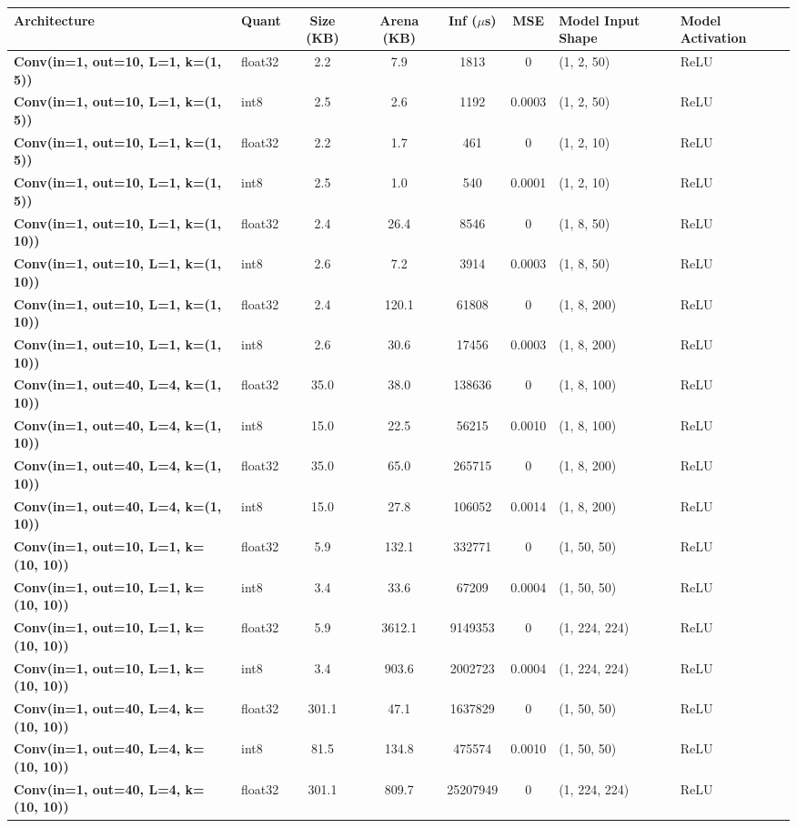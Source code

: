 \begin{tabular}{llccccll}
\toprule
\textbf{Architecture} & Quant & Size (KB) & Arena (KB) & Inf ($\mu$s) & MSE & Model Input Shape & Model Activation \\
\midrule
\textbf{Conv(in=1, out=10, L=1, k=(1, 5))} & float32 & 2.2 & 7.9 & 1813 & 0 & (1, 2, 50) & ReLU \\
\textbf{Conv(in=1, out=10, L=1, k=(1, 5))} & int8 & 2.5 & 2.6 & 1192 & 0.0003 & (1, 2, 50) & ReLU \\
\textbf{Conv(in=1, out=10, L=1, k=(1, 5))} & float32 & 2.2 & 1.7 & 461 & 0 & (1, 2, 10) & ReLU \\
\textbf{Conv(in=1, out=10, L=1, k=(1, 5))} & int8 & 2.5 & 1.0 & 540 & 0.0001 & (1, 2, 10) & ReLU \\
\textbf{Conv(in=1, out=10, L=1, k=(1, 10))} & float32 & 2.4 & 26.4 & 8546 & 0 & (1, 8, 50) & ReLU \\
\textbf{Conv(in=1, out=10, L=1, k=(1, 10))} & int8 & 2.6 & 7.2 & 3914 & 0.0003 & (1, 8, 50) & ReLU \\
\textbf{Conv(in=1, out=10, L=1, k=(1, 10))} & float32 & 2.4 & 120.1 & 61808 & 0 & (1, 8, 200) & ReLU \\
\textbf{Conv(in=1, out=10, L=1, k=(1, 10))} & int8 & 2.6 & 30.6 & 17456 & 0.0003 & (1, 8, 200) & ReLU \\
\textbf{Conv(in=1, out=40, L=4, k=(1, 10))} & float32 & 35.0 & 38.0 & 138636 & 0 & (1, 8, 100) & ReLU \\
\textbf{Conv(in=1, out=40, L=4, k=(1, 10))} & int8 & 15.0 & 22.5 & 56215 & 0.0010 & (1, 8, 100) & ReLU \\
\textbf{Conv(in=1, out=40, L=4, k=(1, 10))} & float32 & 35.0 & 65.0 & 265715 & 0 & (1, 8, 200) & ReLU \\
\textbf{Conv(in=1, out=40, L=4, k=(1, 10))} & int8 & 15.0 & 27.8 & 106052 & 0.0014 & (1, 8, 200) & ReLU \\
\textbf{Conv(in=1, out=10, L=1, k=(10, 10))} & float32 & 5.9 & 132.1 & 332771 & 0 & (1, 50, 50) & ReLU \\
\textbf{Conv(in=1, out=10, L=1, k=(10, 10))} & int8 & 3.4 & 33.6 & 67209 & 0.0004 & (1, 50, 50) & ReLU \\
\textbf{Conv(in=1, out=10, L=1, k=(10, 10))} & float32 & 5.9 & 3612.1 & 9149353 & 0 & (1, 224, 224) & ReLU \\
\textbf{Conv(in=1, out=10, L=1, k=(10, 10))} & int8 & 3.4 & 903.6 & 2002723 & 0.0004 & (1, 224, 224) & ReLU \\
\textbf{Conv(in=1, out=40, L=4, k=(10, 10))} & float32 & 301.1 & 47.1 & 1637829 & 0 & (1, 50, 50) & ReLU \\
\textbf{Conv(in=1, out=40, L=4, k=(10, 10))} & int8 & 81.5 & 134.8 & 475574 & 0.0010 & (1, 50, 50) & ReLU \\
\textbf{Conv(in=1, out=40, L=4, k=(10, 10))} & float32 & 301.1 & 809.7 & 25207949 & 0 & (1, 224, 224) & ReLU \\
\bottomrule
\end{tabular}
